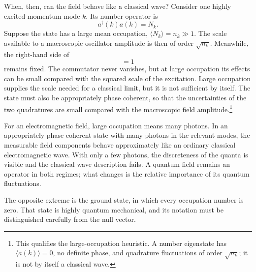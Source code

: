 When, then, can the field behave like a classical wave? Consider one highly excited momentum mode \(k\). Its number operator is
\begin{equation}
a^\dagger(k)a(k)=N_k.
\end{equation}
Suppose the state has a large mean occupation, \(\langle N_k\rangle=n_k\gg 1\). The scale available to a macroscopic oscillator amplitude is then of order \(\sqrt{n_k}\). Meanwhile, the right-hand side of
\begin{equation}
[a(k),a^\dagger(k)]=1
\end{equation}
remains fixed. The commutator never vanishes, but at large occupation its effects can be small compared with the squared scale of the excitation. Large occupation supplies the scale needed for a classical limit, but it is not sufficient by itself. The state must also be appropriately phase coherent, so that the uncertainties of the two quadratures are small compared with the macroscopic field amplitude.\footnote{This qualifies the large-occupation heuristic. A number eigenstate has \(\langle a(k)\rangle=0\), no definite phase, and quadrature fluctuations of order \(\sqrt{n_k}\); it is not by itself a classical wave.}

For an electromagnetic field, large occupation means many photons. In an appropriately phase-coherent state with many photons in the relevant modes, the measurable field components behave approximately like an ordinary classical electromagnetic wave. With only a few photons, the discreteness of the quanta is visible and the classical wave description fails. A quantum field remains an operator in both regimes; what changes is the relative importance of its quantum fluctuations.

\begin{classroomqa}
\end{classroomqa}

The opposite extreme is the ground state, in which every occupation number is zero. That state is highly quantum mechanical, and its notation must be distinguished carefully from the null vector.

\begin{classroomqa}
\end{classroomqa}

